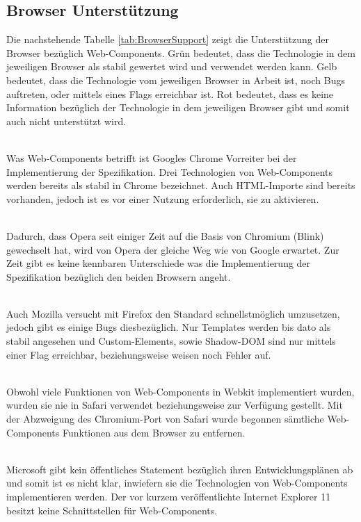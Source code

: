 \subsection{Browser Unterstützung}
\label{sec:3_WC_Support}

Die nachstehende Tabelle \ref{tab:BrowserSupport} zeigt die Unterstützung der Browser bezüglich Web-Components. Grün bedeutet, dass die Technologie in dem jeweiligen Browser als stabil gewertet wird und verwendet werden kann. Gelb bedeutet, dass die Technologie vom jeweiligen Browser in Arbeit ist, noch Bugs auftreten, oder mittels eines Flags erreichbar ist. Rot bedeutet, dass es keine Information bezüglich der Technologie in dem jeweiligen Browser gibt und somit auch nicht unterstützt wird.

\begin{description}
 \hfill \\
Was Web-Components betrifft ist Googles Chrome Vorreiter bei der Implementierung der Spezifikation. Drei Technologien von Web-Components werden bereits als stabil in Chrome bezeichnet. Auch HTML-Importe sind bereits vorhanden, jedoch ist es vor einer Nutzung erforderlich, sie zu aktivieren.

 \hfill \\
Dadurch, dass Opera seit einiger Zeit auf die Basis von Chromium (Blink) gewechselt hat, wird von Opera der gleiche Weg wie von Google erwartet. Zur Zeit gibt es keine kennbaren Unterschiede was die Implementierung der Spezifikation bezüglich den beiden Browsern angeht.

 \hfill \\
Auch Mozilla versucht mit Firefox den Standard schnellstmöglich umzusetzen, jedoch gibt es einige Bugs diesbezüglich. Nur Templates werden bis dato als stabil angesehen und Custom-Elements, sowie Shadow-DOM sind nur mittels einer Flag erreichbar, beziehungsweise weisen noch Fehler auf.

 \hfill \\
Obwohl viele Funktionen von Web-Components in Webkit implementiert wurden, wurden sie nie in Safari verwendet beziehungsweise zur Verfügung gestellt. Mit der Abzweigung des Chromium-Port von Safari wurde begonnen sämtliche Web-Components Funktionen aus dem Browser zu entfernen.

 \hfill \\
Microsoft gibt kein öffentliches Statement bezüglich ihren Entwicklungsplänen ab und somit ist es nicht klar, inwiefern sie die Technologien von Web-Components implementieren werden. Der vor kurzem veröffentlichte Internet Explorer 11 besitzt keine Schnittstellen für Web-Components.

\end{description}

